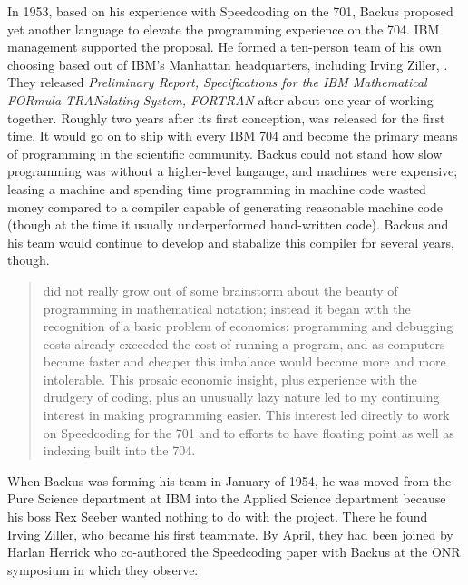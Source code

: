 In 1953, based on his experience with Speedcoding on the 701, Backus proposed
yet another language to elevate the programming experience on the 704. IBM
management supported the proposal. He formed a ten-person team of his own
choosing based out of IBM's Manhattan headquarters, including Irving Ziller,
. They released \textit{Preliminary Report,
    Specifications for the IBM Mathematical FORmula TRANslating System,
    FORTRAN}\cite{IBM_1954_FORTRAN_Specifications} after about one year of working
together. Roughly two years after its first conception, \FTN{} was released for
the first time. It would go on to ship with every IBM 704 and become the
primary means of programming in the scientific community. Backus could not
stand how slow programming was without a higher-level langauge, and machines
were expensive; leasing a machine and spending time programming in machine code
wasted money compared to a compiler capable of generating reasonable machine
code (though at the time it usually underperformed hand-written code). Backus
and his team would continue to develop and stabalize this compiler for several
years, though.

\begin{quotation}
    \FTN{} did not really grow out of some brainstorm about the beauty of
    programming in mathematical notation; instead it began with the recognition
    of a basic problem of economics: programming and debugging costs already
    exceeded the cost of running a program, and as computers became faster
    and cheaper this imbalance would become more and more intolerable. This
    prosaic economic insight, plus experience with the drudgery of coding, plus
    an unusually lazy nature led to my continuing interest in making programming easier.
    This interest led directly to work on Speedcoding for the 701
    and to efforts to have floating point as well as indexing built into the 704.
    \cite{Backus_1980_Programming_in_America_in_1950s}
\end{quotation}

When Backus was forming his team in January of 1954, he was moved from the Pure
Science department at IBM into the Applied Science department because his boss
Rex Seeber wanted nothing to do with the project. There he found Irving Ziller,
who became his first teammate. By April, they had been joined by Harlan Herrick
who co-authored the Speedcoding paper with Backus at the ONR symposium
 in which they observe:

